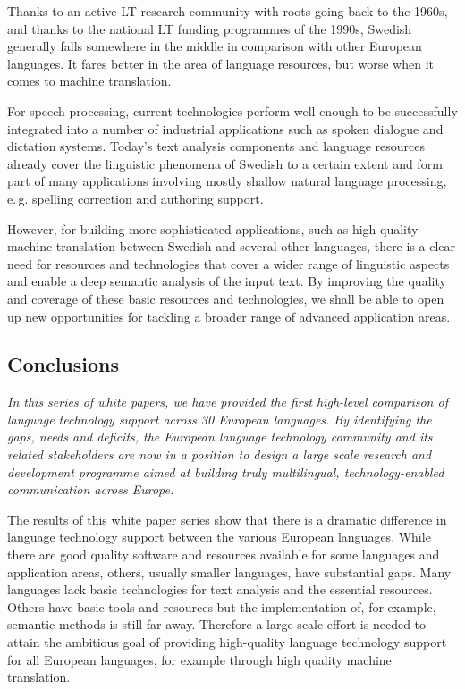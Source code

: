 \begin{multicols}{2}
Thanks to an active LT research community with roots going back to the
1960s, and thanks to the national LT funding programmes of the 1990s,
Swedish generally falls somewhere in the middle in comparison with
other European languages. It fares better in the area of language
resources, but worse when it comes to machine translation.


For speech processing, current technologies perform well enough to be
successfully integrated into a number of industrial applications such
as spoken dialogue and dictation systems. Today's text analysis
components and language resources already cover the linguistic
phenomena of Swedish to a certain extent and form part of many
applications involving mostly shallow natural language processing,
e.\,g. spelling correction and authoring support.

However, for building more sophisticated applications, such as
high-quality machine translation between Swedish and several other
languages, there is a clear need for resources and technologies that
cover a wider range of linguistic aspects and enable a deep semantic
analysis of the input text. By improving the quality and coverage of
these basic resources and technologies, we shall be able to open up
new opportunities for tackling a broader range of advanced application
areas.


\subsection{Conclusions}

\emph{In this series of white papers, we have provided the first high-level comparison of language technology support across 30 European languages.
By identifying the gaps, needs and deficits, the European language technology community and its related stakeholders are now in a position to design a large scale research and development programme aimed at building truly multilingual, technology-enabled communication across Europe.}

The results of this white paper series show that there is a dramatic difference in language technology support between the various European languages. While there are good quality software and resources available for some languages and application areas, others, usually smaller languages, have substantial gaps. Many languages lack basic technologies for text analysis and the essential resources. Others have basic tools and resources but the implementation of, for example, semantic methods is still far away. Therefore a large-scale effort is needed to attain the ambitious goal of providing high-quality language technology support for all European languages, for example through high quality machine translation. 


\end{multicols}
